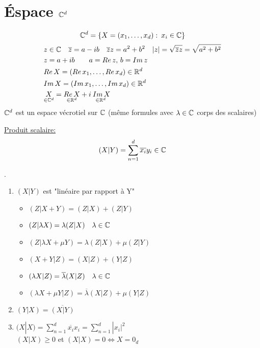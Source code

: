 \section{Éspace $\mathbb{C}^d$}
\begin{definition}
    \[
        \mathbb{C}^d = \{ X = (x_1, \ldots, x_d): \: x_i \in \mathbb{C}\}
    \] 
    \begin{align*}
    &z \in \mathbb{C} \quad \overline{z} = a - ib \quad \overline{z}z = a^2 + b^2 \quad |z| = \sqrt{\overline{z}z} = \sqrt{a^2 + b^2}  \\
    &z = a + ib \qquad a = Re\,z,\,b = Im\,z\\
    &Re\,X = (Re\,x_1, \ldots, Re\,x_d) \in \mathbb{R}^d\\
    &Im\,X = (Im\,x_1, \ldots, Im\,x_d) \in \mathbb{R}^d\\
    &\underset{\in \mathbb{C}^d}{X} = \underset{\in \mathbb{R}^d}{Re\,X} + i\underset{\in \mathbb{R}^d}{\:Im\,X}\\
    \end{align*}
    $\mathbb{C}^d$ est un espace vécrotiel sur  $\mathbb{C}$ (même formules avec $\lambda \in \mathbb{C}$ corps des scalaires)
\end{definition}
\begin{definition}
    \underline{Produit scalaire:}
    \[
        (X|Y) = \sum_{n=1}^{d} \overline{x_i}y_i \in \mathbb{C}
    \] 
\end{definition}
\begin{prop}
   . 
   \begin{enumerate}
       \item $(X|Y)$ est "linéaire par rapport à Y"
           \begin{itemize}
               \item $(Z|X + Y) = (Z|X) + (Z|Y)$
               \item $(Z|\lambda X) = \lambda(Z|X) \quad \lambda \in \mathbb{C}$
               \item  $(Z|\lambda X + \mu Y) = \lambda(Z|X) + \mu(Z|Y)$
               \item  $(X + Y|Z) = (X|Z) + (Y|Z)$
               \item $(\lambda X|Z) = \overline{\lambda}(X|Z) \quad \lambda \in \mathbb{C}$
               \item $(\lambda X + \mu Y|Z) = \overline{\lambda}(X|Z) + \mu(Y|Z)$
           \end{itemize}
       \item $(Y|X) = \overline{(X|Y)}$
       \item $(X|X) = \sum_{n=1}^{d} \overline{x_i}x_i = \sum_{n=1}^{d} |x_i|^2$\\
           $(X|X) \ge 0$ et $(X|X) = 0 \iff X = 0_d$
   \end{enumerate}
\end{prop}
